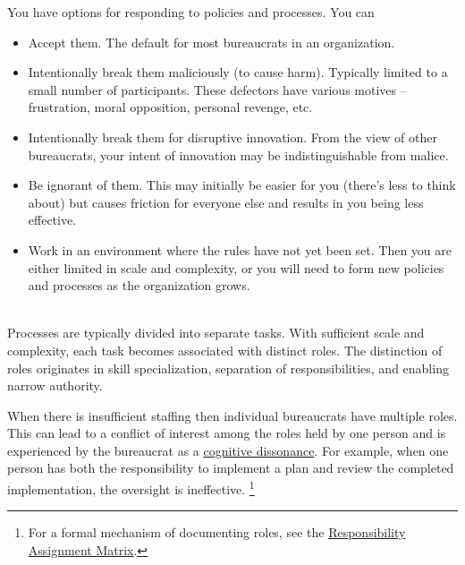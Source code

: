 You have options for responding to policies and processes. You can
\begin{itemize}
    \item Accept them. The default for most bureaucrats in an  organization.
    \item Intentionally break them maliciously (to cause harm). Typically limited to a small number of participants. These defectors have various motives -- frustration, moral opposition, personal revenge, etc.
    \item Intentionally break them for disruptive innovation. 
    From the view of other bureaucrats, your intent of innovation may be indistinguishable from malice. 
    \item Be ignorant of them. This may initially be easier for you (there's less to think about) but causes friction for everyone else and results in you being less effective. 
    \item Work in an environment where the rules have not yet been set. Then you are either limited in scale and complexity, or you will need to form new policies and processes as the organization grows.
\end{itemize}

\ \\

Processes are typically divided into separate tasks. With sufficient scale and complexity, each task becomes associated with distinct roles. The distinction of roles originates in skill specialization, separation of responsibilities, and enabling narrow authority. 

When there is insufficient staffing then individual bureaucrats have multiple roles. This can lead to a conflict of interest among the roles held by one person and is experienced by the bureaucrat as a \href{https://en.wikipedia.org/wiki/Cognitive_dissonance}{cognitive dissonance}. 
For example, when one person has both the responsibility to implement a plan and review the completed implementation, the oversight is ineffective. \footnote{For a formal mechanism of documenting roles, see the 
\href{https://en.wikipedia.org/wiki/Responsibility_assignment_matrix}{Responsibility Assignment Matrix}.
}

